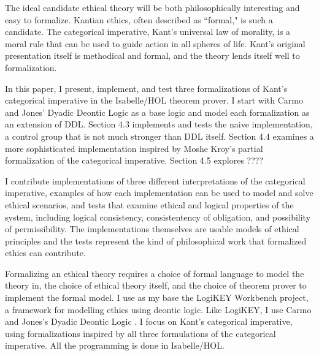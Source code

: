 \begin{isabellebody}
\begin{isamarkuptext}
The ideal candidate ethical theory will be both philosophically interesting and easy to 
formalize. Kantian ethics, often described as ``formal," is such a candidate. The categorical imperative,
Kant's universal law of morality, is a moral rule that can be used to guide action in all spheres of life.
Kant's original presentation itself is methodical and formal, and the theory lends itself well to 
formalization.

In this paper, I present, implement, and test three formalizations of Kant's categorical imperative 
in the Isabelle/HOL theorem prover. I start with Carmo and Jones' Dyadic Deontic Logic as a base
logic and model each formalization as an extension of DDL. Section 4.3 implements and tests
the naive implementation, a control group that is not much stronger than DDL itself. Section 4.4
examines a more sophisticated implementation inspired by Moshe Kroy's partial formalization of the 
categorical imperative. Section 4.5 explores ????

I contribute implementations of three different interpretations of the categorical imperative, 
examples of how each implementation can be used to model and solve ethical scenarios, and tests that
examine ethical and logical properties of the system, including logical consistency, consistentency
of obligation, and possibility of permissibility. The implementations themselves are usable models 
of ethical principles and the tests represent the kind of philosophical work that formalized ethics 
can contribute.%
\end{isamarkuptext}\isamarkuptrue%
%
\isadelimdocument
%
\endisadelimdocument
%
\isatagdocument
%
\isamarkuptrue%
%
\endisatagdocument
{\isafolddocument}%
%
\isadelimdocument
%
\endisadelimdocument
%
\begin{isamarkuptext}%
Formalizing an ethical theory requires a choice of formal language to model the theory in, 
the choice of ethical theory itself, and the choice of theorem prover to implement the formal model.
I use as my base the LogiKEY Workbench \cite{BP} project, a framework for modelling ethics using 
deontic logic. Like LogiKEY, I use Carmo and Jones's Dyadic Deontic Logic \cite{CJDDL}. I focus on 
Kant's categorical imperative, using formalizations inspired by all three formulations of the 
categorical imperative. All the programming is done in Isabelle/HOL.%
\end{isamarkuptext}\isamarkuptrue%
%
\isadelimdocument
%
\endisadelimdocument
%
\isatagdocument
%
\isamarkuptrue%
%
\isamarkuptrue%
%
\isamarkuptrue%
%
\isamarkuptrue%
%
\isamarkuptrue%
%
\isamarkuptrue%
%
\isamarkuptrue%
%
\isamarkuptrue%
%
\endisatagdocument
{\isafolddocument}%
%
\isadelimdocument
%
\endisadelimdocument
%
\isadelimtheory
%
\endisadelimtheory
%
\isatagtheory
%
\endisatagtheory
{\isafoldtheory}%
%
\isadelimtheory
%
\endisadelimtheory
%
\end{isabellebody}%
